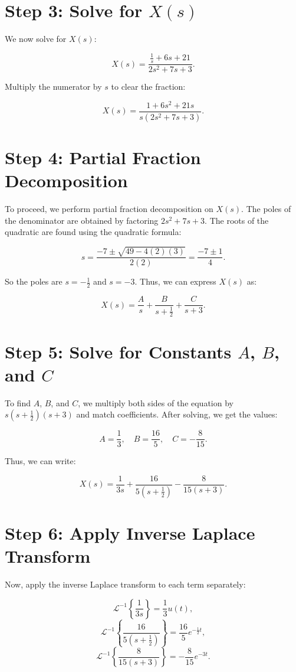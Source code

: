 \documentclass{article}
\begin{document}
\section*{Step 3: Solve for \(X(s)\)}

We now solve for \(X(s)\):

\[
X(s) = \frac{\frac{1}{s} + 6s + 21}{2s^2 + 7s + 3}.
\]

Multiply the numerator by \(s\) to clear the fraction:

\[
X(s) = \frac{1 + 6s^2 + 21s}{s(2s^2 + 7s + 3)}.
\]

\section*{Step 4: Partial Fraction Decomposition}

To proceed, we perform partial fraction decomposition on \(X(s)\). The poles of the denominator are obtained by factoring \(2s^2 + 7s + 3\). The roots of the quadratic are found using the quadratic formula:

\[
s = \frac{-7 \pm \sqrt{49 - 4(2)(3)}}{2(2)} = \frac{-7 \pm 1}{4}.
\]

So the poles are \(s = -\frac{1}{2}\) and \(s = -3\). Thus, we can express \(X(s)\) as:

\[
X(s) = \frac{A}{s} + \frac{B}{s + \frac{1}{2}} + \frac{C}{s + 3}.
\]

\section*{Step 5: Solve for Constants \(A\), \(B\), and \(C\)}

To find \(A\), \(B\), and \(C\), we multiply both sides of the equation by \(s(s + \frac{1}{2})(s + 3)\) and match coefficients. After solving, we get the values:

\[
A = \frac{1}{3}, \quad B = \frac{16}{5}, \quad C = -\frac{8}{15}.
\]

Thus, we can write:

\[
X(s) = \frac{1}{3s} + \frac{16}{5(s + \frac{1}{2})} - \frac{8}{15(s + 3)}.
\]

\section*{Step 6: Apply Inverse Laplace Transform}

Now, apply the inverse Laplace transform to each term separately:

\[
\mathcal{L}^{-1}\left\{\frac{1}{3s}\right\} = \frac{1}{3}u(t),
\]
\[
\mathcal{L}^{-1}\left\{\frac{16}{5(s + \frac{1}{2})}\right\} = \frac{16}{5} e^{-\frac{1}{2}t},
\]
\[
\mathcal{L}^{-1}\left\{\frac{8}{15(s + 3)}\right\} = -\frac{8}{15}e^{-3t}.
\]
\end{document}
